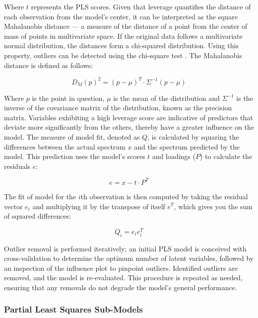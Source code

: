 Where $t$ represents the PLS scores.
Given that leverage quantifies the distance of each observation from the model's center, it can be interpreted as the square Mahalanobis distance — a measure of the distance of a point from the center of mass of points in multivariate space.
If the original data follows a multivariate normal distribution, the distances form a chi-squared distribution. Using this property, outliers can be detected using the chi-square test \cite{brereton_chi_2015}.
The Mahalanobis distance is defined as follows:

\begin{equation}
    D_M(p)^2 = (p - \mu)^T \cdot \Sigma^{-1} (p - \mu)
\end{equation}

Where $p$ is the point in question, $\mu$ is the mean of the distribution and $\Sigma^{-1}$ is the inverse of the covariance matrix of the distribution, known as the precision matrix.
Variables exhibiting a high leverage score are indicative of predictors that deviate more significantly from the others, thereby have a greater influence on the model.
The measure of model fit, denoted as $Q$, is calculated by squaring the differences between the actual spectrum $x$ and the spectrum predicted by the model. This prediction uses the model's scores $t$ and loadings ($P$) to calculate the residuals $e$:

\begin{equation}
    e = x - t \cdot P^T
\end{equation}

The fit of model for the $i$th observation is then computed by taking the residual vector $e_i$ and multiplying it by the transpose of itself $e^T$, which gives you the sum of squared differences:

\begin{equation}
    Q_i = e_{i}e_{i}^T
\end{equation} \cite{marini_chemometrics_2013} \citet{andersonImprovedAccuracyQuantitative2017}

Outlier removal is performed iteratively; an initial PLS model is conceived with cross-validation to determine the optimum number of latent variables, followed by an inspection of the influence plot to pinpoint outliers. Identified outliers are removed, and the model is re-evaluated. This procedure is repeated as needed, ensuring that any removals do not degrade the model's general performance.


\subsubsection{Partial Least Squares Sub-Models}\label{sec:pls_sub-models}

